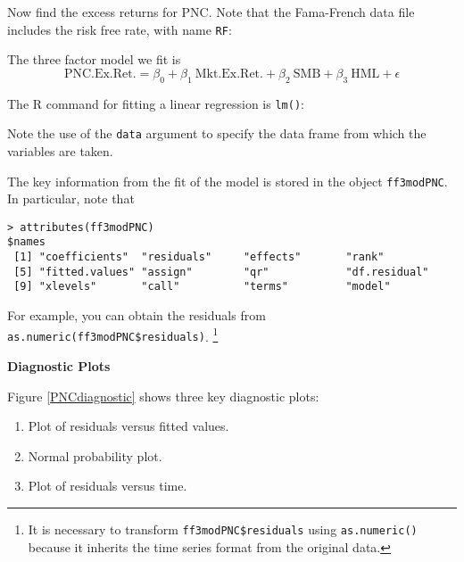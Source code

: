 \documentclass{report}
\begin{document}
Now find the excess returns for PNC. Note that the Fama-French
data file includes the risk free rate, with name {\tt RF}:



\newpage
The three factor model we fit is
\[
   \mbox{PNC.Ex.Ret.} = \beta_0 + \beta_1 \:\mbox{Mkt.Ex.Ret.}
   + \beta_2 \:\mbox{SMB} + \beta_3 \:\mbox{HML} + \epsilon
\]

The R command for fitting a linear regression is {\tt lm()}:


Note the use of the {\tt data} argument to specify the data frame
from which the variables are taken.

The key information from the fit of the model is stored in the
object {\tt ff3modPNC}. 
In particular, note that

\vspace{-.4in}
\normalsize
\begin{verbatim}
> attributes(ff3modPNC)
$names
 [1] "coefficients"  "residuals"     "effects"       "rank"         
 [5] "fitted.values" "assign"        "qr"            "df.residual"  
 [9] "xlevels"       "call"          "terms"         "model"        
\end{verbatim}
\Large

For example, you can obtain the residuals from\\
{\tt as.numeric(ff3modPNC\$residuals)}.
\footnote{It is necessary to transform {\tt ff3modPNC\$residuals} using
{\tt as.numeric()} because it inherits the time series format
from the original data.}


\newpage
{\bf Diagnostic Plots}

Figure \ref{PNCdiagnostic} shows three key diagnostic plots:

\vspace{-.4in}
\begin{enumerate}
\item Plot of residuals versus fitted values. 
\item Normal probability plot.
\item Plot of residuals versus time.
\end{enumerate}
\end{document}
